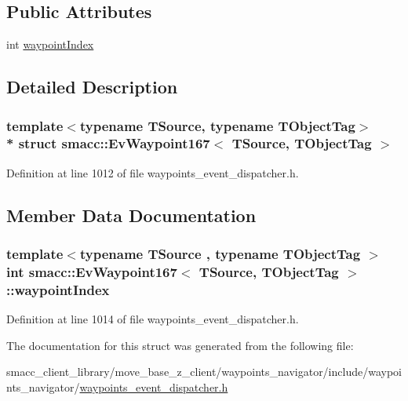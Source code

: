 \subsection*{Public Attributes}
\begin{DoxyCompactItemize}
\item 
int \hyperlink{structsmacc_1_1EvWaypoint167_a7ff8567c8343c6f7cb8db4dd448d900a}{waypoint\+Index}
\end{DoxyCompactItemize}


\subsection{Detailed Description}
\subsubsection*{template$<$typename T\+Source, typename T\+Object\+Tag$>$\\*
struct smacc\+::\+Ev\+Waypoint167$<$ T\+Source, T\+Object\+Tag $>$}



Definition at line 1012 of file waypoints\+\_\+event\+\_\+dispatcher.\+h.



\subsection{Member Data Documentation}
\subsubsection[{\texorpdfstring{waypoint\+Index}{waypointIndex}}]{\setlength{\rightskip}{0pt plus 5cm}template$<$typename T\+Source , typename T\+Object\+Tag $>$ int {\bf smacc\+::\+Ev\+Waypoint167}$<$ T\+Source, T\+Object\+Tag $>$\+::waypoint\+Index}\hypertarget{structsmacc_1_1EvWaypoint167_a7ff8567c8343c6f7cb8db4dd448d900a}{}\label{structsmacc_1_1EvWaypoint167_a7ff8567c8343c6f7cb8db4dd448d900a}


Definition at line 1014 of file waypoints\+\_\+event\+\_\+dispatcher.\+h.



The documentation for this struct was generated from the following file\+:\begin{DoxyCompactItemize}
\item 
smacc\+\_\+client\+\_\+library/move\+\_\+base\+\_\+z\+\_\+client/waypoints\+\_\+navigator/include/waypoints\+\_\+navigator/\hyperlink{waypoints__event__dispatcher_8h}{waypoints\+\_\+event\+\_\+dispatcher.\+h}\end{DoxyCompactItemize}
